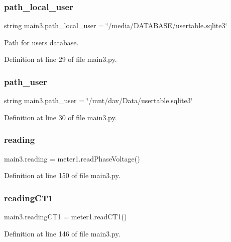 \subsubsection{path\+\_\+local\+\_\+user}
{\footnotesize\ttfamily string main3.\+path\+\_\+local\+\_\+user = \char`\"{}/media/D\+A\+T\+A\+B\+A\+SE/usertable.\+sqlite3\char`\"{}}



Path for users database. 



Definition at line 29 of file main3.\+py.

\mbox{\label{namespacemain3_a7e2fe5acbb746b4190127a6d04b418ed}} 
\subsubsection{path\+\_\+user}
{\footnotesize\ttfamily string main3.\+path\+\_\+user = \char`\"{}/mnt/dav/Data/usertable.\+sqlite3\char`\"{}}



Definition at line 30 of file main3.\+py.

\mbox{\label{namespacemain3_a34f71711d9f071c11a4574c8d3cef88d}} 
\subsubsection{reading}
{\footnotesize\ttfamily main3.\+reading = meter1.\+read\+Phase\+Voltage()}



Definition at line 150 of file main3.\+py.

\mbox{\label{namespacemain3_ad4596b47de04ad652b165f8a319cc003}} 
\subsubsection{reading\+C\+T1}
{\footnotesize\ttfamily main3.\+reading\+C\+T1 = meter1.\+read\+C\+T1()}



Definition at line 146 of file main3.\+py.

\mbox{\label{namespacemain3_a66971b3af77d619b5249162539add371}} 
